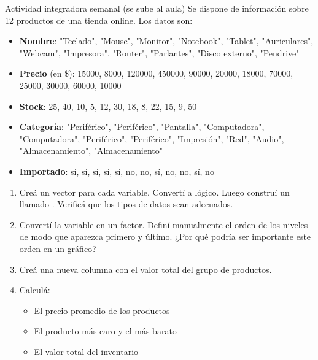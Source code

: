 \documentclass[8pt]{beamer}
\begin{document}
\begin{frame}[fragile]{Actividad integradora semanal (se sube al aula)}
	Se dispone de información sobre 12 productos de una tienda online. Los datos son:
	
	\begin{itemize}
		\item \textbf{Nombre}: "Teclado", "Mouse", "Monitor", "Notebook", "Tablet", "Auriculares", "Webcam", "Impresora", "Router", "Parlantes", "Disco externo", "Pendrive"
		\item \textbf{Precio} (en \$): 15000, 8000, 120000, 450000, 90000, 20000, 18000, 70000, 25000, 30000, 60000, 10000
		\item \textbf{Stock}: 25, 40, 10, 5, 12, 30, 18, 8, 22, 15, 9, 50
		\item \textbf{Categoría}: "Periférico", "Periférico", "Pantalla", "Computadora", "Computadora", "Periférico", "Periférico", "Impresión", "Red", "Audio", "Almacenamiento", "Almacenamiento"
		\item \textbf{Importado}: sí, sí, sí, sí, sí, no, no, sí, no, no, sí, no
	\end{itemize}
	
	\begin{enumerate}
		\item Creá un vector para cada variable. Convertí  a lógico. Luego construí un  llamado . Verificá que los tipos de datos sean adecuados.
		
		\item Convertí la variable  en un factor. Definí manualmente el orden de los niveles de modo que  aparezca primero y  último. ¿Por qué podría ser importante este orden en un gráfico?
		
		\item Creá una nueva columna  con el valor total del grupo de productos.
		
		\item Calculá:
		\begin{itemize}
			\item El precio promedio de los productos
			\item El producto más caro y el más barato
			\item El valor total del inventario
		\end{itemize}
	\end{enumerate}
\end{frame}
\end{document}
